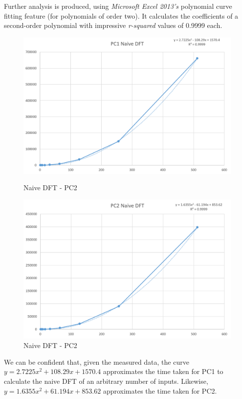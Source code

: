 \documentclass[]{article}
\begin{document}
Further analysis is produced, using \emph{Microsoft Excel 2013's} polynomial curve fitting feature (for polynomials of order two). It calculates the coefficients of a second-order polynomial with impressive \emph{r-squared} values of 0.9999 each.
\begin{figure}[!htbp]
	\centering
	\begin{minipage}[b]{0.4\textwidth}
		\includegraphics[width=\linewidth]{csv/pc1-dft-fit}
		\caption{Naive DFT - PC2\label{fig:pc1-dft-fit}}
	\end{minipage}
	\hfill
	\begin{minipage}[b]{0.4\textwidth}
		\includegraphics[width=\linewidth]{csv/pc2-dft-fit}
		\caption{Naive DFT - PC2\label{fig:pc2-dft-fit}}
	\end{minipage}
\end{figure}

We can be confident that, given the measured data, the curve $y = 2.7225x^2 + 108.29x + 1570.4$ approximates the time taken for PC1 to calculate the naive DFT of an arbitrary number of inputs. Likewise, $y = 1.6355x^2 + 61.194x + 853.62$ approximates the time taken for PC2.
\end{document}
